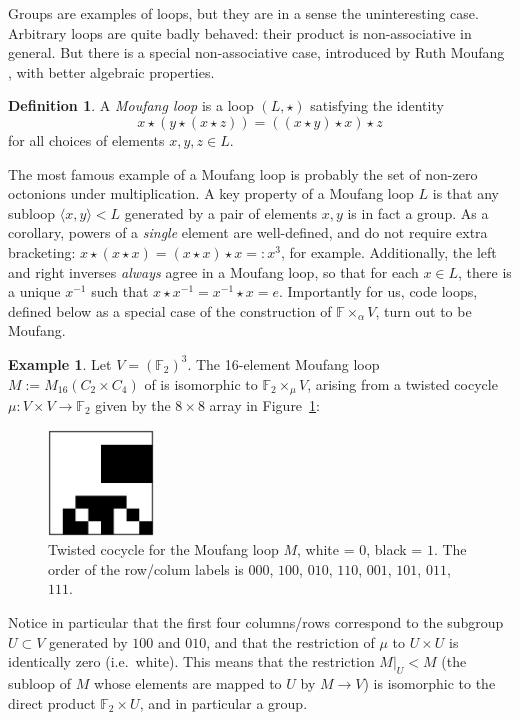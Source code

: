 \documentclass{article}
\theoremstyle{plain}
\theoremstyle{definition}
\newtheorem*{definition}{Definition}
\newtheorem{example}{Example}
\def \FF {\mathbb{F}}
\begin{document}
Groups are examples of loops, but they are in a sense the uninteresting case. 
Arbitrary loops are quite badly behaved: their product is non-associative in general. 
But there is a special non-associative case, introduced by Ruth Moufang \cite{Moufang}, with better algebraic properties.

\begin{definition}
A \emph{Moufang loop} is a loop $(L,\star)$ satisfying the identity
\[
x \star (y \star (x \star z)) = ((x \star y) \star x) \star z
\]
for all choices of elements $x,y,z\in L$.
\end{definition}

The most famous example of a Moufang loop is probably the set of non-zero octonions under multiplication. 
A key property of a Moufang loop $L$ is that any subloop $\langle x,y\rangle < L$ generated by a pair of elements $x,y$ is in fact a group. 
As a corollary, powers of a \emph{single} element are well-defined, and do not require extra bracketing: $x\star (x \star x) = (x\star x) \star x =: x^3$, for example. 
Additionally, the left and right inverses \emph{always} agree in a Moufang loop, so that for each $x\in L$, there is a unique $x^{-1}$ such that $x\star x^{-1} = x^{-1}\star x = e$. 
Importantly for us, code loops, defined below as a special case of the construction of $\FF\times_\alpha V$, turn out to be Moufang.

\begin{example}\label{example:m16}
Let $V= (\FF_2)^3$. The 16-element Moufang loop $M := M_{16}(C_2\times C_4)$ of \cite[Theorem 2]{Chein} is isomorphic to $\FF_2 \times_\mu V$,  arising from a twisted cocycle $\mu\colon V\times V\to\FF_2$ given by the $8\times 8$ array in Figure~\ref{fig:cocycle for M}:
\medskip
\begin{figure}[!hb]
\begin{center}
\includegraphics[width=0.25\textwidth]{m16.png}
\end{center}
\caption{Twisted cocycle for the Moufang loop $M$, white = $0$, black = $1$. The order of the row/colum labels is $000$, $100$, $010$, $110$, $001$, $101$, $011$, $111$. }\label{fig:cocycle for M}
\end{figure}


Notice in particular that the first four columns/rows correspond to the subgroup $U\subset V$ generated by $100$ and $010$, and that the restriction of $\mu$ to $U\times U$ is identically zero (i.e.\ white). 
This means that the restriction $M\big|_U < M$ (the subloop of $M$ whose elements are mapped to $U$ by $M \to V$) is isomorphic to the direct product $\FF_2\times U$, and in particular a group.
\end{example}
\end{document}
